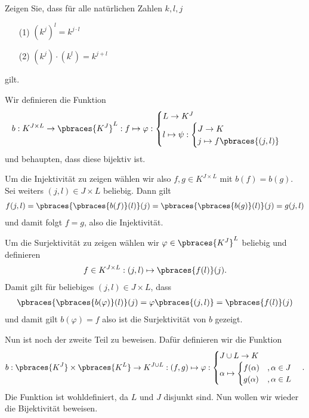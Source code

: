\begin{exercise}
    Zeigen Sie, dass für alle natürlichen Zahlen $k,l,j$ 
    \begin{itemize}
        \item[(1)] $(k^j)^l = k^{j \cdot l}$ 
        \item[(2)] $(k^j) \cdot (k^l) = k^{j + l}$
    \end{itemize}
    gilt.
\end{exercise}

\begin{solution}
    Wir definieren die Funktion 
    \begin{align*}
        b: K^{J \times L} \to \pbraces{K^J}^L : f \mapsto \varphi: 
        \begin{cases}
            L \to K^J \\
            l \mapsto \psi: 
            \begin{cases}
                J \to K \\
                j \mapsto f\pbraces{(j,l)}
            \end{cases}
        \end{cases}  
    \end{align*}
    und behaupten, dass diese bijektiv ist.

    Um die Injektivität zu zeigen wählen wir also $f,g \in K^{J \times L}$ mit $b(f) = b(g)$. Sei weiters $(j,l) \in J \times L$ beliebig. Dann gilt 
    \begin{align*}
        f(j,l) = \pbraces{ \pbraces{b(f) }(l) }(j) = \pbraces{ \pbraces{b(g) }(l) }(j) = g(j,l)
    \end{align*}
    und damit folgt $f = g$, also die Injektivität.

    Um die Surjektivität zu zeigen wählen wir $\varphi \in \pbraces{K^J}^L$ beliebig und definieren 
    \begin{align*}
        f \in K^{J \times L}: (j, l) \mapsto \pbraces{f(l)}(j).
    \end{align*}
    Damit gilt für beliebiges $(j,l) \in J \times L$, dass
    \begin{align*}
        \pbraces{\pbraces{b(\varphi) }(l) }(j) = \varphi\pbraces{(j,l)} = \pbraces{f(l)}(j)
    \end{align*}
    und damit gilt $b(\varphi) = f$ also ist die Surjektivität von $b$ gezeigt.
    
    Nun ist noch der zweite Teil zu beweisen. Dafür definieren wir die Funktion
    \begin{align*}
        b: \pbraces{K^J} \times \pbraces{K^L} \to K^{J \cup L}: (f,g) \mapsto \varphi:
        \begin{cases}
            J \cup L \to K \\
            \alpha \mapsto 
            \begin{cases}
                f(\alpha) &, \alpha \in J \\
                g(\alpha) &, \alpha \in L
            \end{cases}
        \end{cases} .
    \end{align*}
    Die Funktion ist wohldefiniert, da $L$ und $J$ disjunkt sind. Nun wollen wir wieder die Bijektivität beweisen.


\end{solution}
